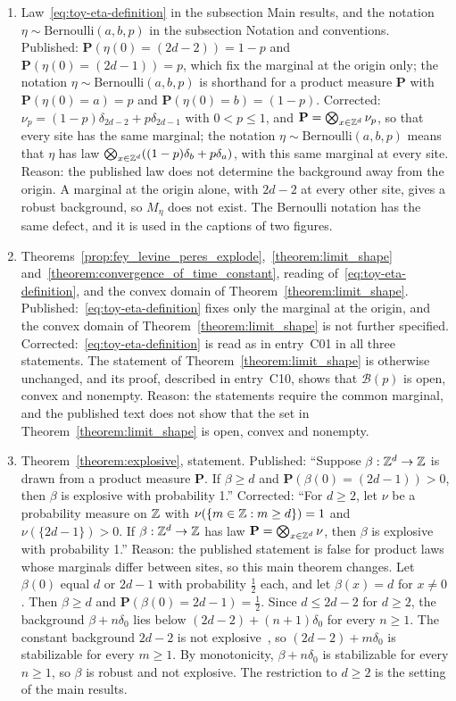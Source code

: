 \documentclass[12pt]{amsart}
\begin{document}
\begin{enumerate}
\item[C01.] Law~\eqref{eq:toy-eta-definition} in the subsection Main results, and the notation $\eta\sim\mathrm{Bernoulli}(a,b,p)$ in the subsection Notation and conventions. Published: $\mathbf P(\eta(0)=(2d-2))=1-p$ and $\mathbf P(\eta(0)=(2d-1))=p$, which fix the marginal at the origin only; the notation $\eta\sim\mbox{Bernoulli}(a,b,p)$ is shorthand for a product measure $\mathbf P$ with $\mathbf P(\eta(0)=a)=p$ and $\mathbf P(\eta(0)=b)=(1-p)$. Corrected: $\nu_p=(1-p)\delta_{2d-2}+p\delta_{2d-1}$ with $0<p\leq1$, and $\mathbf P=\bigotimes_{x\in\mathbb{Z}^d}\nu_p$, so that every site has the same marginal; the notation $\eta\sim\mathrm{Bernoulli}(a,b,p)$ means that $\eta$ has law $\bigotimes_{x\in\mathbb{Z}^d}((1-p)\delta_b+p\delta_a)$, with this same marginal at every site. Reason: the published law does not determine the background away from the origin. A marginal at the origin alone, with $2d-2$ at every other site, gives a robust background, so $M_\eta$ does not exist. The Bernoulli notation has the same defect, and it is used in the captions of two figures.
\item[C02.] Theorems~\ref{prop:fey_levine_peres_explode},~\ref{theorem:limit_shape} and~\ref{theorem:convergence_of_time_constant}, reading of~\eqref{eq:toy-eta-definition}, and the convex domain of Theorem~\ref{theorem:limit_shape}. Published:~\eqref{eq:toy-eta-definition} fixes only the marginal at the origin, and the convex domain of Theorem~\ref{theorem:limit_shape} is not further specified. Corrected:~\eqref{eq:toy-eta-definition} is read as in entry~C01 in all three statements. The statement of Theorem~\ref{theorem:limit_shape} is otherwise unchanged, and its proof, described in entry~C10, shows that $\mathcal B(p)$ is open, convex and nonempty. Reason: the statements require the common marginal, and the published text does not show that the set in Theorem~\ref{theorem:limit_shape} is open, convex and nonempty.
\item[C03.] Theorem~\ref{theorem:explosive}, statement. Published: ``Suppose $\beta:\mathbb{Z}^d\to\mathbb{Z}$ is drawn from a product measure $\mathbf P$. If $\beta\geq d$ and $\mathbf P(\beta(0)=(2d-1))>0$, then $\beta$ is explosive with probability 1.'' Corrected: ``For $d\geq2$, let $\nu$ be a probability measure on $\mathbb{Z}$ with $\nu(\{m\in\mathbb{Z}:m\geq d\})=1$ and $\nu(\{2d-1\})>0$. If $\beta:\mathbb{Z}^d\to\mathbb{Z}$ has law $\mathbf P=\bigotimes_{x\in\mathbb{Z}^d}\nu$, then $\beta$ is explosive with probability 1.'' Reason: the published statement is false for product laws whose marginals differ between sites, so this main theorem changes. Let $\beta(0)$ equal $d$ or $2d-1$ with probability $\tfrac12$ each, and let $\beta(x)=d$ for $x\neq0$. Then $\beta\geq d$ and $\mathbf P(\beta(0)=2d-1)=\tfrac12$. Since $d\leq2d-2$ for $d\geq2$, the background $\beta+n\delta_0$ lies below $(2d-2)+(n+1)\delta_0$ for every $n\geq1$. The constant background $2d-2$ is not explosive~\cite{fey2010growth}, so $(2d-2)+m\delta_0$ is stabilizable for every $m\geq1$. By monotonicity, $\beta+n\delta_0$ is stabilizable for every $n\geq1$, so $\beta$ is robust and not explosive. The restriction to $d\geq2$ is the setting of the main results.

\end{enumerate}
\end{document}
